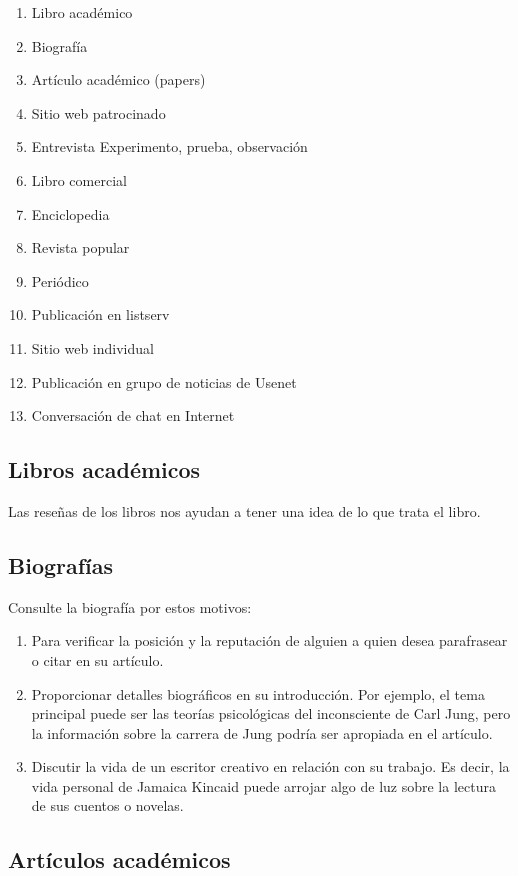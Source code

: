 \begin{enumerate}[1.]
    \item Libro académico 
    \item Biografía 
    \item Artículo académico (papers)
    \item Sitio web patrocinado 
    \item Entrevista Experimento, prueba, observación 
    \item Libro comercial 
    \item Enciclopedia 
    \item Revista popular 
    \item Periódico 
    \item Publicación en listserv 
    \item Sitio web individual 
    \item Publicación en grupo de noticias de Usenet 
    \item Conversación de chat en Internet
\end{enumerate}	

\subsection{Libros académicos}
Las reseñas de los libros nos ayudan a tener una idea de lo que trata el libro.

\subsection{Biografías}
Consulte la biografía por estos motivos:
\begin{enumerate}[1]
    \item Para verificar la posición y la reputación de alguien a quien desea parafrasear o citar en su artículo. 
    \item Proporcionar detalles biográficos en su introducción. Por ejemplo, el tema principal puede ser las teorías psicológicas del inconsciente de Carl Jung, pero la información sobre la carrera de Jung podría ser apropiada en el artículo.
    \item Discutir la vida de un escritor creativo en relación con su trabajo. Es decir, la vida personal de Jamaica Kincaid puede arrojar algo de luz sobre la lectura de sus cuentos o novelas.
\end{enumerate}

\subsection{Artículos académicos}


